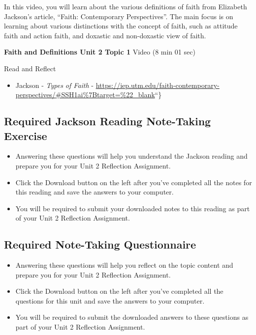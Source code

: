 \documentclass[
]{book}
\providecommand{\tightlist}{%
  \setlength{\itemsep}{0pt}\setlength{\parskip}{0pt}}
\begin{document}
In this video, you will learn about the various definitions of faith from Elizabeth Jackson's article, ``Faith: Contemporary Perspectives''. The main focus is on learning about various distinctions with the concept of faith, such as attitude faith and action faith, and doxastic and non-doxastic view of faith.

\textbf{Faith and Definitions Unit 2 Topic 1} Video (8 min 01 sec)

Read and Reflect

\begin{itemize}
\tightlist
\item
  Jackson - \emph{Types of Faith} - \url{https://iep.utm.edu/faith-contemporary-perspectives/\#SSH1ai\%7Btarget=\%22_blank}``\}
\end{itemize}

\hypertarget{required-jackson-reading-note-taking-exercise}{%
\subsection*{Required Jackson Reading Note-Taking Exercise}\label{required-jackson-reading-note-taking-exercise}}

\begin{reflect}
\begin{itemize}
\tightlist
\item
  Answering these questions will help you understand the Jackson reading and prepare you for your Unit 2 Reflection Assignment.
\item
  Click the Download button on the left after you've completed all the notes for this reading and save the answers to your computer.
\item
  You will be required to submit your downloaded notes to this reading as part of your Unit 2 Reflection Assignment.
\end{itemize}
\end{reflect}

\hypertarget{required-note-taking-questionnaire-4}{%
\subsection*{Required Note-Taking Questionnaire}\label{required-note-taking-questionnaire-4}}

\begin{reflect}
\begin{itemize}
\tightlist
\item
  Answering these questions will help you reflect on the topic content and prepare you for your Unit 2 Reflection Assignment.
\item
  Click the Download button on the left after you've completed all the questions for this unit and save the answers to your computer.
\item
  You will be required to submit the downloaded answers to these questions as part of your Unit 2 Reflection Assignment.
\end{itemize}
\end{reflect}
\end{document}

